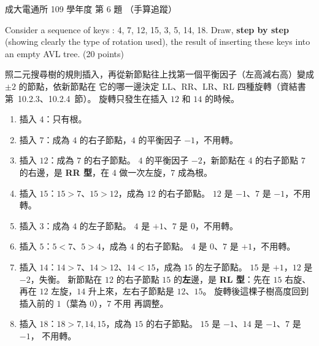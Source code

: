 \begin{pastexam}[label={px:ncku-109-comm-ds-06}]{成大電通所 109 學年度 第 6 題}
（手算追蹤）

Consider a sequence of keys : 4, 7, 12, 15, 3, 5, 14, 18. Draw, \textbf{step by step} (showing
clearly the type of rotation used), the result of inserting these keys into an empty AVL tree.
(20 points)
\end{pastexam}

\begin{pastsoln}
照二元搜尋樹的規則插入，再從新節點往上找第一個平衡因子（左高減右高）變成 $\pm 2$ 的節點，依新節點在
它的哪一邊決定 LL、RR、LR、RL 四種旋轉（資結書第~10.2.3、10.2.4~節）。 旋轉只發生在插入 $12$ 和
$14$ 的時候。
\begin{enumerate}
\item 插入 $4$：只有根。
\item 插入 $7$：成為 $4$ 的右子節點，$4$ 的平衡因子 $-1$，不用轉。
\item 插入 $12$：成為 $7$ 的右子節點。 $4$ 的平衡因子 $-2$，新節點在 $4$ 的右子節點 $7$ 的右邊，是
\textbf{RR 型}，在 $4$ 做一次左旋，$7$ 成為根。
\item 插入 $15$：$15 > 7$、$15 > 12$，成為 $12$ 的右子節點。 $12$ 是 $-1$、$7$ 是 $-1$，不用轉。
\item 插入 $3$：成為 $4$ 的左子節點。 $4$ 是 $+1$、$7$ 是 $0$，不用轉。
\item 插入 $5$：$5 < 7$、$5 > 4$，成為 $4$ 的右子節點。 $4$ 是 $0$、$7$ 是 $+1$，不用轉。
\item 插入 $14$：$14 > 7$、$14 > 12$、$14 < 15$，成為 $15$ 的左子節點。 $15$ 是 $+1$，$12$ 是
$-2$，失衡。 新節點在 $12$ 的右子節點 $15$ 的\textbf{左}邊，是 \textbf{RL 型}：先在 $15$ 右旋、再在 $12$
左旋，$14$ 升上來，左右子節點是 $12$、$15$。 旋轉後這棵子樹高度回到插入前的 $1$（葉為 $0$），$7$ 不用
再調整。
\item 插入 $18$：$18 > 7, 14, 15$，成為 $15$ 的右子節點。 $15$ 是 $-1$、$14$ 是 $-1$、$7$ 是 $-1$，
不用轉。
\end{enumerate}


\end{pastsoln}
